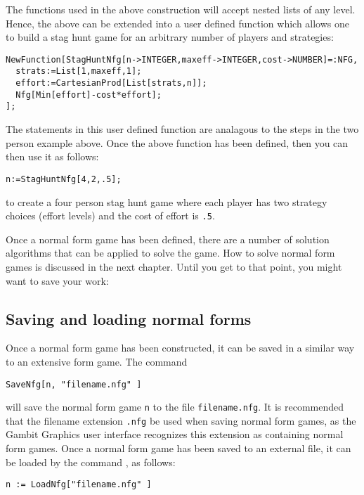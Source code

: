 The functions used in the above construction will accept nested lists
of any level.  Hence, the above can be extended into a user defined
function which allows one to build a stag hunt game for an arbitrary
number of players and strategies:

\begin{verbatim}
NewFunction[StagHuntNfg[n->INTEGER,maxeff->INTEGER,cost->NUMBER]=:NFG,
  strats:=List[1,maxeff,1];
  effort:=CartesianProd[List[strats,n]];
  Nfg[Min[effort]-cost*effort];
];
\end{verbatim}

\noindent
The statements in this user defined function are analagous to the
steps in the two person example above.  Once the above function has
been defined, then you can then use it as follows:

\begin{verbatim}
n:=StagHuntNfg[4,2,.5];
\end{verbatim}

\noindent
to create a four person stag hunt game where each player has two
strategy choices (effort levels) and the cost of effort is \verb+.5+.

Once a normal form game has been defined, there are a number of
solution algorithms that can be applied to solve the game.  How to
solve normal form games is discussed in the next chapter.  Until you
get to that point, you might want to save your work:

\subsection{Saving and loading normal forms}

Once a normal form game has been constructed, it can be saved in a
similar way to an extensive form game.  The command 

\begin{verbatim}
SaveNfg[n, "filename.nfg" ]
\end{verbatim}

\noindent
will save the normal form game \verb+n+ to the file
\verb+filename.nfg+.  It is recommended that the filename extension
\verb+.nfg+ be used when saving normal form games, as the Gambit
Graphics user interface recognizes this extension as containing normal
form games.  Once a normal form game has been saved to an external
file, it can be loaded by the command , as follows:

\begin{verbatim}
n := LoadNfg["filename.nfg" ]
\end{verbatim}



